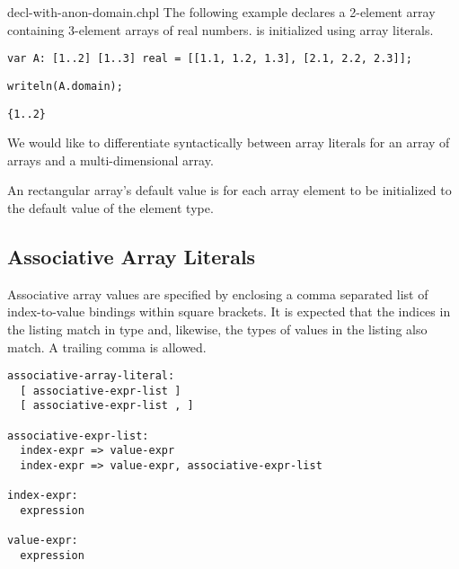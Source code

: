 \begin{chapelexample}{decl-with-anon-domain.chpl}
The following example declares a 2-element array  containing 3-element
arrays of real numbers.   is initialized using array literals.
\begin{chapel}
\begin{verbatim}
var A: [1..2] [1..3] real = [[1.1, 1.2, 1.3], [2.1, 2.2, 2.3]];
\end{verbatim}
\end{chapel}
\begin{chapelpost}
\begin{verbatim}
writeln(A.domain);
\end{verbatim}
\end{chapelpost}
\begin{chapeloutput}
\begin{verbatim}
{1..2}
\end{verbatim}
\end{chapeloutput}
\end{chapelexample}

\begin{openissue}
We would like to differentiate syntactically between array literals for an array
of arrays and a multi-dimensional array. 
\end{openissue}

An rectangular array's default value is for each array element to be initialized to
the default value of the element type.

\subsection{Associative Array Literals}
\label{Associative_Array_Literals}

Associative array values are specified by enclosing a comma separated list of
index-to-value bindings within square brackets. It is expected that the indices 
in the listing match in type and, likewise, the types of values in the listing 
also match. A trailing comma is allowed.

\begin{syntax}
\begin{verbatim}
associative-array-literal:
  [ associative-expr-list ]
  [ associative-expr-list , ]

associative-expr-list:
  index-expr => value-expr
  index-expr => value-expr, associative-expr-list

index-expr:
  expression

value-expr:
  expression
\end{verbatim}
\end{syntax}

